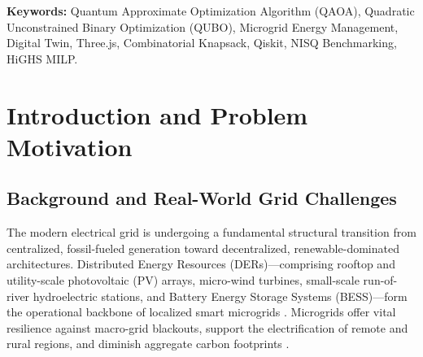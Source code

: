 \documentclass[11pt,a4paper]{article}
\theoremstyle{definition}
\theoremstyle{remark}
\begin{document}
\begin{abstract}
Empirical validation was performed across 282 controlled experimental runs spanning seven benchmark campaigns using simulated statevectors with 2,048 projective measurement shots per trial. The QAOA depth sweep demonstrated that advancing variational circuit depth from $p = 1$ to $p = 3$ generated a $74.4\%$ relative increase in optimal ground-state probability mass, achieving a $98.33\%$ ($59/60$) raw-register optimum recovery rate and a $94.44\%$ ($68/72$) ground-state recovery across indivisible switching instances encoded with 5--9 qubits. Conversely, classical mixed-integer linear programming (HiGHS) solved $100\%$ ($50/50$) of scalability benchmark instances up to 200 feeders in an average runtime of $21.3\text{ ms}$, whereas legacy unpruned branch-and-bound exhibited an exponential 1,900-fold runtime increase between 10 and 20 feeders ($3.07\text{ ms}$ to $5,827.09\text{ ms}$). To bridge the operational gap between quantum optimization telemetry and human operators, we architected an interactive, 60 FPS isometric 3D WebGL digital twin employing Three.js, custom GLSL volumetric god-ray shaders, procedural Web Audio synthesis, and bidirectional parameter synchronization. Our findings demonstrate that while classical MILP retains clear practical computational superiority for medium-to-large microgrids in the NISQ era, QAOA provides an effective variational formulation for combinatorial feeder allocation, with the accompanying digital twin establishing a robust, reproducible testbed for future hybrid quantum energy management systems.
\end{abstract}

\vspace{1ex}
\noindent \textbf{Keywords:} Quantum Approximate Optimization Algorithm (QAOA), Quadratic Unconstrained Binary Optimization (QUBO), Microgrid Energy Management, Digital Twin, Three.js, Combinatorial Knapsack, Qiskit, NISQ Benchmarking, HiGHS MILP.

\newpage
\tableofcontents
\newpage

\section{Introduction and Problem Motivation}
\label{sec:intro}

\subsection{Background and Real-World Grid Challenges}
The modern electrical grid is undergoing a fundamental structural transition from centralized, fossil-fueled generation toward decentralized, renewable-dominated architectures. Distributed Energy Resources (DERs)---comprising rooftop and utility-scale photovoltaic (PV) arrays, micro-wind turbines, small-scale run-of-river hydroelectric stations, and Battery Energy Storage Systems (BESS)---form the operational backbone of localized smart microgrids \cite{hirsch2018}. Microgrids offer vital resilience against macro-grid blackouts, support the electrification of remote and rural regions, and diminish aggregate carbon footprints \cite{sharma2022}.
\end{document}
